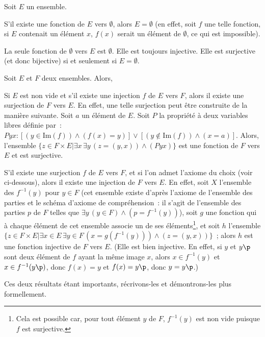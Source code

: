    \done 

\blank[medium]

Soit $E$ un ensemble. 
\startitemize[nowhite]
    \item S'il existe une fonction de $E$ vers $\emptyset$, alors $E = \emptyset$ (en effet, soit $f$ une telle fonction, si $E$ contenait un élément $x$, $f(x)$ serait un élément de $\emptyset$, ce qui est impossible).
    \item La seule fonction de $\emptyset$ vers $E$ est $\emptyset$. 
        Elle est toujours injective. 
        Elle est surjective (et donc bijective) si et seulement si $E = \emptyset$.
\stopitemize

\blank[medium]

Soit $E$ et $F$ deux ensembles. 
Alors, 
\startitemize
    \item Si $E$ est non vide et s'il existe une injection $f$ de $E$ vers $F$, alors il existe une surjection de $F$ vers $E$. 
        En effet, une telle surjection peut être construite de la manière suivante. 
        Soit $a$ un élément de $E$.
        Soit $P$ la propriété à deux variables libres définie par : $P y x: [(y \in \mathrm{Im}(f)) \wedge (f(x) = y)] \vee [(y \notin \mathrm{Im}(f)) \wedge (x = a)]$. 
        Alors, l'ensemble $\lbrace z \in F \times E \vert \exists x \, \exists y \, (z = (y,x)) \wedge (P y x) \rbrace$ est une fonction de $F$ vers $E$ et est surjective.
    \item S'il existe une surjection $f$ de $E$ vers $F$, et si l'on admet l'axiome du choix (voir ci-dessous), alors il existe une injection de $F$ vers $E$. 
        En effet, soit $X$ l'ensemble des $f^{-1}(y)$ pour $y \in F$ (cet ensemble existe d'après l'axiome de l'ensemble des parties et le schéma d'axiome de compréhension : il s'agit de l'ensemble des parties $p$ de $F$ telles que $\exists y \, (y \in F) \wedge (p = f^{-1}(y))$), soit $g$ une fonction qui à chaque élément de cet ensemble associe un de ses éléments\footnote{Cela est possible car, pour tout élément $y$ de $F$, $f^{-1}(y)$ est non vide puisque $f$ est surjective.}, et soit $h$ l'ensemble $\lbrace z \in F \times E \vert \exists x \in E \, \exists y \in F \, (x = g(f^{-1}(y))) \wedge (z=(y,x)) \rbrace$ ; alors $h$ est une fonction injective de $F$ vers $E$. (Elle est bien injective. En effet, si $y$ et $y\p$ sont deux élément de $f$ ayant la même image $x$, alors $x \in f^{-1}(y)$ et $x \in f^{-1}(y\p)$, donc $f(x) = y$ et $f(x) = y\p$, donc $y=y\p$.)
\stopitemize

Ces deux résultats étant importants, récrivons-les et démontrons-les plus formellement.

